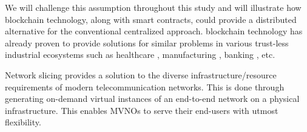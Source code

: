 We will challenge this assumption throughout this study and will illustrate how blockchain technology, along with smart contracts, could provide a distributed alternative for the conventional centralized approach. blockchain technology has already proven to provide solutions for similar problems in various trust-less industrial ecosystems such as healthcare \cite{mettler2016blockchain}, manufacturing \cite{abeyratne2016blockchain}, banking \cite{guo2016blockchain}, etc.






Network slicing provides a solution to the diverse infrastructure/resource requirements of modern telecommunication networks. This is done through generating on-demand virtual instances of an end-to-end network on a physical infrastructure. This enables \acp{MVNO} to serve their end-users with utmost flexibility. 

